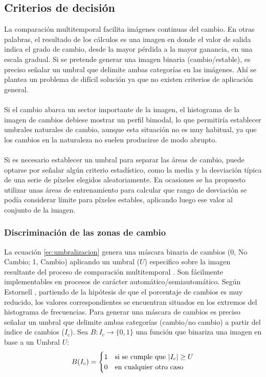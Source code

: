 \subsection{Criterios de decisi\'on}
La comparaci\'on multitemporal facilita im\'agenes continuas del cambio. En otras palabras, el resultado de los c\'alculos es una imagen en donde el valor de salida indica el grado de cambio, desde la mayor p\'erdida a la mayor ganancia, en una escala gradual. Si se pretende generar una imagen binaria (cambio/estable), es preciso se\~{n}alar un umbral que delimite ambas categor\'ias en las im\'agenes. Ah\'i se plantea un problema de dif\'icil soluci\'on ya que no existen criterios de aplicación general.\\~\\
Si el cambio abarca un sector importante de la imagen, el histograma de la imagen de cambios debiese mostrar un perfil bimodal, lo que permitir\'ia establecer umbrales naturales de cambio, aunque esta situaci\'on no es muy habitual, ya que los cambios en la naturaleza no suelen producirse de modo abrupto\cite{martinez2013normalizacion}.\\~\\
Si es necesario establecer un umbral para separar las \'areas de cambio, puede optarse por se\~{n}alar alg\'un criterio estad\'istico, como la media y la desviaci\'on t\'ipica de una serie de p\'ixeles elegidos aleatoriamente. En ocasiones se ha propuesto utilizar unas \'areas de entrenamiento para calcular que rango de desviaci\'on se pod\'ia considerar l\'imite para p\'ixeles estables, aplicando luego ese valor al conjunto de la imagen\cite{tung1988determination}.

\subsubsection{Discriminaci\'on de las zonas de cambio}\label{sec:discriminacion}
La ecuaci\'on \ref{ec:umbralizacion} genera una m\'ascara binaria de cambios (0, No Cambio; 1, Cambio) aplicando un umbral ($ U $) especifico sobre la imagen resultante del proceso de comparaci\'on multitemporal \cite{singh1989review}. Son f\'acilmente implementables en procesos de car\'acter autom\'atico/semiautom\'atico. Según Estornell \cite{estornell2004analisis}, partiendo de la hip\'otesis de que el porcentaje de cambios es muy reducido, los valores correspondientes se encuentran situados en los extremos del histograma de frecuencias. Para generar una m\'ascara de cambios es preciso se\~{n}alar un umbral que delimite ambas categorías (cambio/no cambio) a partir del \'indice de cambios ($ I_{c} $)\cite{radke2005image}.
Sea $ B:I_{c} \longrightarrow \{0,1\}$ 	una funci\'on que binariza una imagen en base a un Umbral $ U $:
\begin{equation}\label{ec:umbralizacion}
B(I_{c}) = \begin{cases}
1 & \text{si se cumple que } \abs{I_c} \geq U \\
0 & \text{en cualquier otro caso}
\end{cases}
\end{equation}

